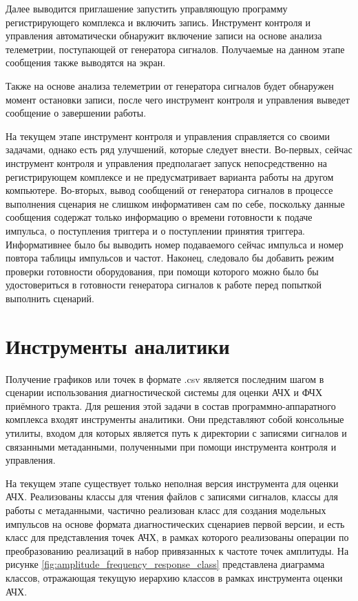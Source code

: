 \documentclass{report}
\begin{document}
Далее выводится приглашение запустить управляющую программу регистрирующего комплекса и включить запись. Инструмент контроля и управления автоматически обнаружит включение записи на основе анализа телеметрии, поступающей от генератора сигналов. Получаемые на данном этапе сообщения также выводятся на экран.

Также на основе анализа телеметрии от генератора сигналов будет обнаружен момент остановки записи, после чего инструмент контроля и управления выведет сообщение о завершении работы.

На текущем этапе инструмент контроля и управления справляется со своими задачами, однако есть ряд улучшений, которые следует внести. Во-первых, сейчас инструмент контроля и управления предполагает запуск непосредственно на регистрирующем комплексе и не предусматривает варианта работы на другом компьютере. Во-вторых, вывод сообщений от генератора сигналов в процессе выполнения сценария не слишком информативен сам по себе, поскольку данные сообщения содержат только информацию о времени готовности к подаче импульса, о поступления триггера и о поступлении принятия триггера. Информативнее было бы выводить номер подаваемого сейчас импульса и номер повтора таблицы импульсов и частот. Наконец, следовало бы добавить режим проверки готовности оборудования, при помощи которого можно было бы удостовериться в готовности генератора сигналов к работе перед попыткой выполнить сценарий.

\section{Инструменты аналитики}

Получение графиков или точек в формате .csv является последним шагом в сценарии использования диагностической системы для оценки АЧХ и ФЧХ приёмного тракта. Для решения этой задачи в состав программно-аппаратного комплекса входят инструменты аналитики. Они представляют собой консольные утилиты, входом для которых является путь к директории с записями сигналов и связанными метаданными, полученными при помощи инструмента контроля и управления.

На текущем этапе существует только неполная версия инструмента для оценки АЧХ. Реализованы классы для чтения файлов с записями сигналов, классы для работы с метаданными, частично реализован класс для создания модельных импульсов на основе формата диагностических сценариев первой версии, и есть класс для представления точек АЧХ, в рамках которого реализованы операции по преобразованию реализаций в набор привязанных к частоте точек амплитуды. На рисунке \ref{fig:amplitude_frequency_response_class} представлена диаграмма классов, отражающая текущую иерархию классов в рамках инструмента оценки АЧХ.
\end{document}
